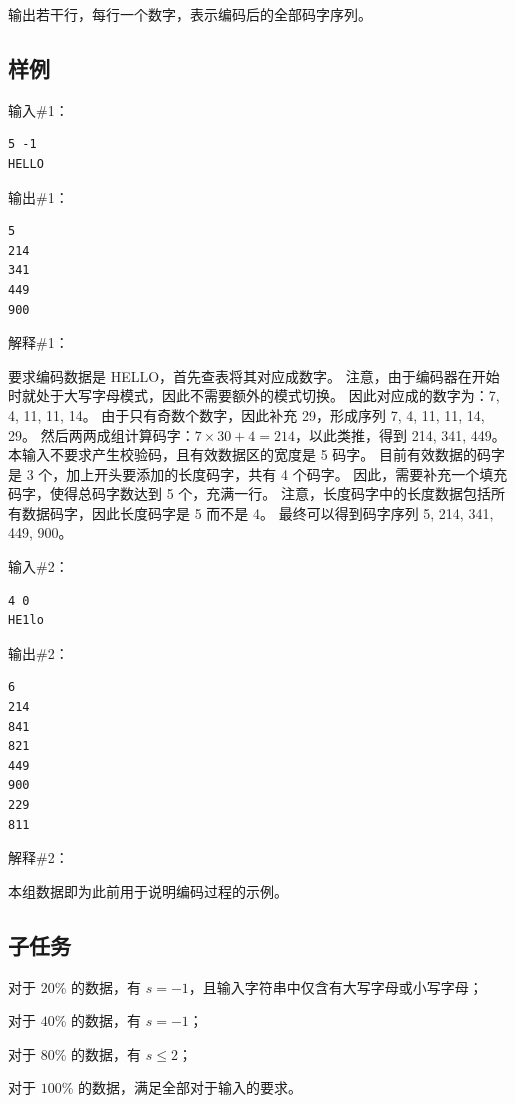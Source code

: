输出若干行，每行一个数字，表示编码后的全部码字序列。

\subsection*{样例}

输入\#1：

\begin{lstlisting}
5 -1
HELLO
\end{lstlisting}

输出\#1：

\begin{lstlisting}
5
214
341
449
900
\end{lstlisting}

解释\#1：

要求编码数据是 HELLO，首先查表将其对应成数字。
注意，由于编码器在开始时就处于大写字母模式，因此不需要额外的模式切换。
因此对应成的数字为：7, 4, 11, 11, 14。
由于只有奇数个数字，因此补充 29，形成序列 7, 4, 11, 11, 14, 29。
然后两两成组计算码字：$7\times 30+4=214$，以此类推，得到 214, 341, 449。
本输入不要求产生校验码，且有效数据区的宽度是 5 码字。
目前有效数据的码字是 3 个，加上开头要添加的长度码字，共有 4 个码字。
因此，需要补充一个填充码字，使得总码字数达到 5 个，充满一行。
注意，长度码字中的长度数据包括所有数据码字，因此长度码字是 5 而不是 4。
最终可以得到码字序列 5, 214, 341, 449, 900。

输入\#2：

\begin{lstlisting}
4 0
HE1lo
\end{lstlisting}

输出\#2：

\begin{lstlisting}
6
214
841
821
449
900
229
811
\end{lstlisting}

解释\#2：

本组数据即为此前用于说明编码过程的示例。

\subsection*{子任务}

对于 $20$\% 的数据，有 $s=-1$，且输入字符串中仅含有大写字母或小写字母；

对于 $40$\% 的数据，有 $s=-1$；

对于 $80$\% 的数据，有 $s\le 2$；

对于 $100$\% 的数据，满足全部对于输入的要求。